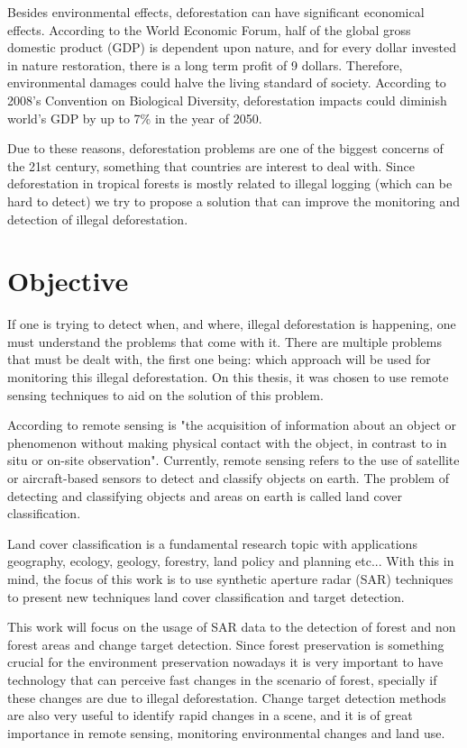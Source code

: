Besides environmental effects, deforestation can have significant economical effects. According to the World Economic Forum, half of the global gross domestic product (GDP)
is dependent upon nature, and for every dollar invested in nature restoration, there is a long term profit of 9 dollars. Therefore, environmental damages could halve the living standard of society.
According to 2008's Convention on Biological Diversity, deforestation impacts could diminish world's GDP by up to 7\% in the year of 2050.

Due to these reasons, deforestation problems are one of the biggest concerns of the 21st century, something that countries are interest to deal with. Since deforestation in tropical forests is mostly related to illegal
logging (which can be hard to detect) we try to propose a solution that can improve the monitoring and detection of illegal deforestation.

\section{Objective}

If one is trying to detect when, and where, illegal deforestation is happening, one must understand the problems that come with it. There are multiple problems that must be dealt with, the first one being: which approach will be used for
monitoring this illegal deforestation. On this thesis, it was chosen to use remote sensing techniques to aid on the solution of this problem.

According to \cite{Schott1996RemoteST} remote sensing is "the acquisition of information about an object or phenomenon without making physical contact with the object, in contrast to in situ or on-site observation". Currently, remote sensing
refers to the use of satellite or aircraft-based sensors to detect and classify objects on earth. The problem of detecting and classifying objects and areas on earth is called land cover classification.

Land cover classification is a fundamental research topic with applications geography,
ecology, geology, forestry, land policy and planning etc... With this in mind, the focus of this work is to use synthetic aperture radar (SAR) techniques to present
new techniques land cover classification and target detection.

This work will focus on the usage of SAR data to the detection of forest and non
forest areas and change target detection. Since forest preservation is something crucial
for the environment preservation nowadays it is very important to have technology that
can perceive fast changes in the scenario of forest, specially if these changes are due to
illegal deforestation. Change target detection methods are also very useful to identify
rapid changes in a scene, and it is of great importance in remote sensing, monitoring
environmental changes and land use.

